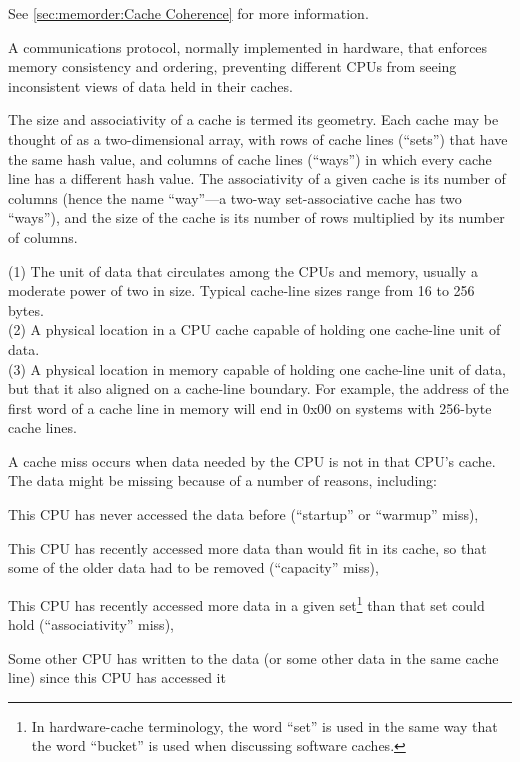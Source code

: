 \begin{description}
	See \cref{sec:memorder:Cache Coherence}
	for more information.
\item[\IXG{Cache-Coherence Protocol}:]
	A communications protocol, normally implemented in hardware,
	that enforces memory consistency and ordering, preventing
	different CPUs from seeing inconsistent views of data held
	in their caches.
\item[\IXG{Cache Geometry}:]
	The size and associativity of a cache is termed its geometry.
	Each cache may be thought of as a two-dimensional array,
	with rows of cache lines (``sets'') that have the same hash
	value, and columns of cache lines (``ways'') in which every
	cache line has a different hash value.
	The associativity of a given cache is its number of
	columns (hence the name ``way''---a two-way set-associative
	cache has two ``ways''), and the size of the cache is its
	number of rows multiplied by its number of columns.
\item[\IXG{Cache Line}:]
	(1) The unit of data that circulates among the CPUs and memory,
	usually a moderate power of two in size.
	Typical cache-line sizes range from 16 to 256 bytes. \\
	(2) A physical location in a CPU cache capable of holding
	one cache-line unit of data. \\
	(3) A physical location in memory capable of holding one
	cache-line unit of data, but that it also aligned
	on a cache-line boundary.
	For example, the address of the first word of a cache line
	in memory will end in 0x00 on systems with 256-byte cache lines.
\item[\IXG{Cache Miss}:]
	A cache miss occurs when data needed by the CPU is not in
	that CPU's cache.
	The data might be missing because of a number of reasons,
	including:
	\begin{enumerate*}[(1)]
	\item This CPU has never accessed the data before
	(``startup'' or ``warmup'' miss),
	\item This CPU has recently accessed more
	data than would fit in its cache, so that some of the older
	data had to be removed (``capacity'' miss),
	\item This CPU
	has recently accessed more data in a given set\footnote{
		In hardware-cache terminology, the word ``set''
		is used in the same way that the word ``bucket''
		is used when discussing software caches.}
	than that set could hold (``associativity'' miss),
	\item Some other CPU has written to the data (or some other
	data in the same cache line) since this CPU has accessed it

\end{enumerate*}
\end{description}
